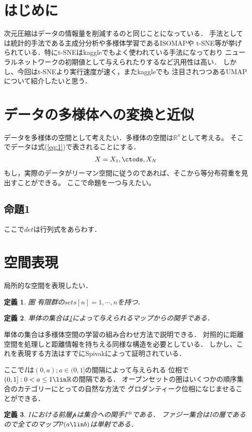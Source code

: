 \documentclass{jsarticle}
\newtheorem{dfn}{定義}
\begin{document}
\section{はじめに}
次元圧縮はデータの情報量を削減するのと同じことになっている．
手法としては統計的手法である主成分分析や多様体学習であるISOMAPや
t-SNE等が挙げられている．特にt-SNEはkaggleでもよく使われている手法になっており
ニューラルネットワークの初期値として与えられたりするなど汎用性は高い．
しかし、今回はt-SNEより実行速度が速く，またkaggleでも
注目されつつあるUMAPについて紹介したいと思う．

\section{データの多様体への変換と近似}
データを多様体の空間として考えたい．多様体の空間は$\mathbb{R}^n$として考える。
そこでデータは式(\ref{eq:1})で表されることにする．
\begin{eqnarray}
  X={X_1,\ctods,X_N}
\end{eqnarray}
もし，実際のデータがリーマン空間に従うのであれば、そこから等分布荷重を見出すことができる。
ここで命題を一つ与えたい。

\subsection{命題1}
ここで$det$は行列式をあらわす．

\section{空間表現}
局所的な空間を表現したい．
\begin{dfn}
  \label{den:1}
  圏
  有限群の$sets[n]={1,\cdots,n}$を持つ．
\end{dfn}

\begin{dfn}
  単体の集合は\ref{den:1}によって与えられるマップからの関手である．
\end{dfn}

単体の集合は多様体空間の学習の組み合わせ方法で説明できる．
対照的に距離空間を処理しと距離情報を持ちえる同様な構造を必要としている．
しかし、これを表現する方法はすでにSpivakによって証明されている．

ここで$I$は$(0,a);a\in(0,1]$の間隔によって与えられる
 位相で$(0,1]:{0<a\le1}\lin\mathbb{R}$の間隔である．
オープンセットの圏はいくつかの順序集合のカテゴリーにとっての自然な方法で
グロダンティーク位相になじませることができる．
\begin{dfn}
  $I$における前層$\mathcal{p}$は集合への関手$I^{op}$である．
  ファジー集合はIの層であるので全てのマップ$\mathcal{P}(a \lin b)$は単射である．
\end{dfn}
\end{document}
